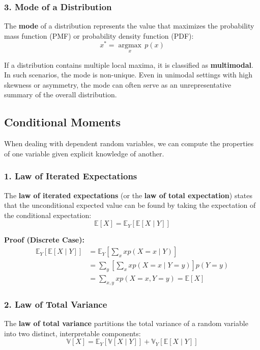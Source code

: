 \documentclass{article}
\begin{document}
\subsubsection*{3. Mode of a Distribution}
The \textbf{mode} of a distribution represents the value that maximizes the probability mass function (PMF) or probability density function (PDF):
\begin{equation}
    x^* = \underset{x}{\operatorname{argmax}} \, p(x)
\end{equation}

If a distribution contains multiple local maxima, it is classified as \textbf{multimodal}. In such scenarios, the mode is non-unique. Even in unimodal settings with high skewness or asymmetry, the mode can often serve as an unrepresentative summary of the overall distribution.

\subsection*{Conditional Moments}
When dealing with dependent random variables, we can compute the properties of one variable given explicit knowledge of another.

\subsubsection*{1. Law of Iterated Expectations}
The \textbf{law of iterated expectations} (or the \textbf{law of total expectation}) states that the unconditional expected value can be found by taking the expectation of the conditional expectation:
\begin{equation}
    \mathbb{E}[X] = \mathbb{E}_Y \left[ \mathbb{E}[X \mid Y] \right]
\end{equation}

\noindent \textbf{Proof (Discrete Case):}
\begin{align}
    \mathbb{E}_Y \left[ \mathbb{E}[X \mid Y] \right] &= \mathbb{E}_Y \left[ \sum_{x} x p(X = x \mid Y) \right] \\
    &= \sum_{y} \left[ \sum_{x} x p(X = x \mid Y = y) \right] p(Y = y) \\
    &= \sum_{x,y} x p(X = x, Y = y) = \mathbb{E}[X]
\end{align}

\subsubsection*{2. Law of Total Variance}
The \textbf{law of total variance} partitions the total variance of a random variable into two distinct, interpretable components:
\begin{equation}
    \mathbb{V}[X] = \mathbb{E}_Y\left[\mathbb{V}[X \mid Y]\right] + \mathbb{V}_Y\left[\mathbb{E}[X \mid Y]\right]
\end{equation}
\end{document}

